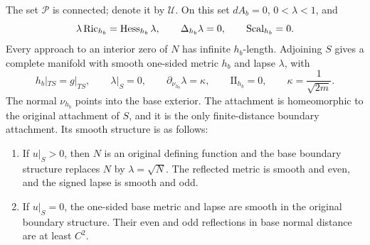 \begin{proposition}
\label{q4:sta:complete-base}
The set $\mathcal P$ is connected; denote it by $\mathcal U$. On this set
$dA_b=0$, $0<\lambda<1$, and
\begin{equation}\label{q4:sta:static-equations}
 \lambda\operatorname{Ric}_{h_b}=\operatorname{Hess}_{h_b}\lambda,
 \qquad \Delta_{h_b}\lambda=0,
 \qquad \operatorname{Scal}_{h_b}=0.
\end{equation}
Every approach to an interior zero of $N$ has infinite $h_b$-length.
Adjoining $S$ gives a complete manifold with smooth one-sided metric
$h_b$ and lapse $\lambda$, with
\begin{equation}\label{q4:sta:boundary-data}
 h_b|_{TS}=g|_{TS},\qquad \lambda|_S=0,
 \qquad \partial_{\nu_{h_b}}\lambda=\kappa,
 \qquad \mathrm{II}_{h_b}=0,
 \qquad \kappa=\frac1{\sqrt{2m}}.
\end{equation}
The normal $\nu_{h_b}$ points into the base exterior. The attachment is
homeomorphic to the original attachment of $S$, and it is the only
finite-distance boundary attachment. Its smooth structure is as follows:
\begin{enumerate}[label=(\roman*)]
\item If $u|_S>0$, then $N$ is an original defining function and the
base boundary structure replaces $N$ by $\lambda=\sqrt N$. The reflected
metric is smooth and even, and the signed lapse is smooth and odd.
\item If $u|_S=0$, the one-sided base metric and lapse are smooth in
the original boundary structure. Their even and odd reflections in base
normal distance are at least $C^2$.
\end{enumerate}
\end{proposition}

